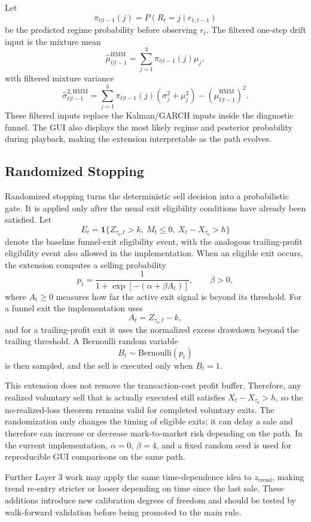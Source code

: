 \documentclass[11pt]{article}
\begin{document}
Let
\[
\pi_{t|t-1}(j)=P(R_t=j\mid r_{1:t-1})
\]
be the predicted regime probability before observing \(r_t\). The filtered
one-step drift input is the mixture mean
\[
\hat\mu^{\mathrm{HMM}}_{t|t-1}
=
\sum_{j=1}^{3}\pi_{t|t-1}(j)\mu_j,
\]
with filtered mixture variance
\[
\hat\sigma^{2,\mathrm{HMM}}_{t|t-1}
=
\sum_{j=1}^{3}\pi_{t|t-1}(j)(\sigma_j^2+\mu_j^2)
-\left(\hat\mu^{\mathrm{HMM}}_{t|t-1}\right)^2.
\]
These filtered inputs replace the Kalman/GARCH inputs inside the diagnostic
funnel. The GUI also displays the most likely regime and posterior probability
during playback, making the extension interpretable as the path evolves.

\subsection{Randomized Stopping}

Randomized stopping turns the deterministic sell decision into a probabilistic
gate. It is applied only after the usual exit eligibility conditions have
already been satisfied. Let
\[
E_t =
\mathbf 1\{
Z_{\tau_b,t}>k,\ M_t\leq 0,\ X_t-X_{\tau_b}>h
\}
\]
denote the baseline funnel-exit eligibility event, with the analogous
trailing-profit eligibility event also allowed in the implementation. When an
eligible exit occurs, the extension computes a selling probability
\[
p_t
=
\frac{1}{1+\exp[-(\alpha+\beta A_t)]},
\qquad \beta>0,
\]
where \(A_t\geq 0\) measures how far the active exit signal is beyond its
threshold. For a funnel exit the implementation uses
\[
A_t=Z_{\tau_b,t}-k,
\]
and for a trailing-profit exit it uses the normalized excess drawdown beyond
the trailing threshold. A Bernoulli random variable
\[
B_t\sim \mathrm{Bernoulli}(p_t)
\]
is then sampled, and the sell is executed only when \(B_t=1\).

This extension does not remove the transaction-cost profit buffer. Therefore,
any realized voluntary sell that is actually executed still satisfies
\(X_t-X_{\tau_b}>h\), so the no-realized-loss theorem remains valid for
completed voluntary exits. The randomization only changes the timing of
eligible exits; it can delay a sale and therefore can increase or decrease
mark-to-market risk depending on the path. In the current implementation,
\(\alpha=0\), \(\beta=4\), and a fixed random seed is used for reproducible GUI
comparisons on the same path.

Further Layer 3 work may apply the same time-dependence idea to
\(z_{\mathrm{trend}}\), making trend re-entry stricter or looser depending on
time since the last sale. These additions introduce new calibration degrees of
freedom and should be tested by walk-forward validation before being promoted
to the main rule.
\end{document}
